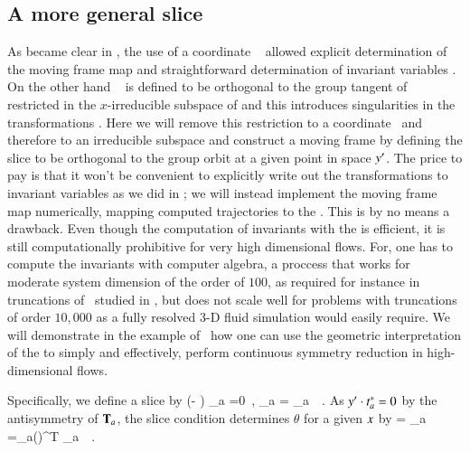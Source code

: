
\subsection{\label{s:mfReqb}A more general slice}

As became clear in , the use of a coordinate \slice\  
allowed explicit determination of the moving frame map  and straightforward 
determination of invariant variables . 
On the other hand \slice\  is defined to be orthogonal
to the group tangent of  restricted in the $x$-irreducible subspace of  
and this introduces singularities in the transformations .
Here we will remove this restriction to a coordinate \slice\ and therefore to 
an irreducible subspace and construct a moving frame by defining the slice to be orthogonal 
to the group orbit at a given point in space ${y'}$. The price to pay is that it 
won't be convenient to explicitly write out the transformations to invariant variables
as we did in ; we will instead implement the moving frame map numerically,
mapping computed trajectories to the \slice.
This is by no means a drawback. Even though the computation of invariants with the 
{\mframes} is efficient, it is still computationally
prohibitive for very high dimensional flows. For, one has
to compute the invariants with computer algebra, a proccess 
that works for moderate system dimension of the order of $100$,
as required for instance in truncations of \KSe\ studied in ,
but does not scale well for problems with truncations of order $10,000$ as
a fully resolved $3$-D fluid simulation would easily require.
We will demonstrate in the example of \cLe\ 
how one can use the geometric interpretation of the {\mframes} 
to simply and effectively, perform continuous symmetry
reduction in high-dimensional flows.


Specifically, we define a slice by
\beq
(\sspRed - \slicep ) \cdot \sliceTan_a =0
    \,,\qquad
\sliceTan_a  = \Lg_a \, \slicep
\,.
As ${y'}  \cdot t^*_a =0$ by the antisymmetry of
$\mathbf{T}_a$, the slice condition  determines
$\theta$ for a given $x$ by
 = \sspRed \cdot \Lg_a \, \slicep
	=\ssp \cdot \LieElrep_a(\theta)^T \Lg_a \, \slicep
\,.

